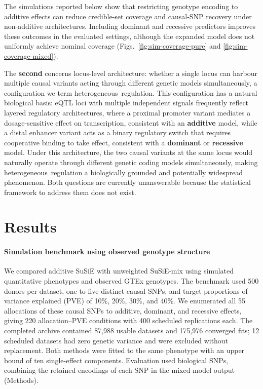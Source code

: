 \documentclass[12pt]{article}
\begin{document}
The simulations reported below show that restricting genotype encoding
to additive effects can reduce credible-set coverage and causal-SNP
recovery under non-additive architectures. Including dominant and
recessive predictors improves these outcomes in the evaluated settings,
although the expanded model does not uniformly achieve nominal
coverage (Figs.~\ref{fig:sim-coverage-pure} and
\ref{fig:sim-coverage-mixed}).

The \textbf{second} concerns locus-level architecture: whether a
single locus can harbour multiple causal variants acting through
different genetic models simultaneously, a configuration we term
heterogeneous~regulation. This configuration has a natural biological basis:
eQTL loci with multiple independent signals frequently reflect layered
regulatory architectures, where a proximal promoter variant mediates a
dosage-sensitive effect on transcription, consistent with an
\textbf{additive} model, while a distal
enhancer variant acts as a binary regulatory switch that requires
cooperative binding to take effect, consistent with a
\textbf{dominant} or
\textbf{recessive} model. Under this
architecture, the two causal variants at the same locus would
naturally operate through different genetic coding models
simultaneously, making heterogeneous~regulation a biologically grounded
and potentially widespread phenomenon. Both questions are currently
unanswerable because the statistical framework to address them does
not exist.
\section{Results}

\paragraph{Simulation benchmark using observed genotype structure}

We compared additive SuSiE with unweighted SuSiE-mix using simulated
quantitative phenotypes and observed GTEx genotypes. The benchmark used
500 donors per dataset, one to five distinct causal SNPs, and target
proportions of variance explained (PVE) of 10\%, 20\%, 30\%, and 40\%.
We enumerated all 55 allocations of these causal SNPs to additive,
dominant, and recessive effects, giving 220 allocation--PVE conditions
with 400 scheduled replications each. The completed archive contained
87,988 usable datasets and 175,976 converged fits; 12 scheduled datasets
had zero genetic variance and were excluded without replacement.
Both methods were fitted to the same phenotype with an upper bound of
ten single-effect components. Evaluation used biological SNPs, combining
the retained encodings of each SNP in the mixed-model output (Methods).
\end{document}
